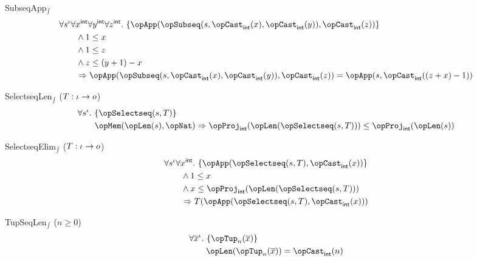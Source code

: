 \documentclass[11pt, a4paper, oneside]{article}
\begin{document}
\begin{axioms}
\item[SubseqApp$_\int$] \[
        \begin{aligned}
            &\forall s^\idv \forall x^\int \forall y^\int \forall z^\int.\, \st{ \opApp(\opSubseq(s, \opCast_\int(x), \opCast_\int(y)), \opCast_\int(z)) } \\
            &\qquad \wedge 1 \le x \\
            &\qquad \wedge 1 \le z \\
            &\qquad \wedge z \le (y + 1) - x \\
            &\qquad \imp \opApp(\opSubseq(s, \opCast_\int(x), \opCast_\int(y)), \opCast_\int(z)) = \opApp(s, \opCast_\int((z + x) - 1))
        \end{aligned}
    \]

\item[SelectseqLen$_\int$ ($T : \iota \rightarrow o$)] \[
        \begin{aligned}
            &\forall s^\idv.\, \st{ \opSelectseq(s, T) } \\
            &\qquad \opMem(\opLen(s), \opNat) \imp \opProj_\int(\opLen(\opSelectseq(s, T))) \le \opProj_\int(\opLen(s))
        \end{aligned}
    \]

\item[SelectseqElim$_\int$ ($T : \iota \rightarrow o$)] \[
        \begin{aligned}
            &\forall s^\idv \forall x^\int.\, \st{ \opApp(\opSelectseq(s, T), \opCast_\int(x)) } \\
            &\qquad \wedge 1 \le x \\
            &\qquad \wedge x \le \opProj_\int(\opLen(\opSelectseq(s, T))) \\
            &\qquad \imp T(\opApp(\opSelectseq(s, T), \opCast_\int(x)))
        \end{aligned}
    \]

\item[TupSeqLen$_\int$ ($n \ge 0$)] \[
        \begin{aligned}
            &\forall \overline{x}^\idv.\, \st{ \opTup_n(\overline{x}) } \\
            &\qquad \opLen(\opTup_n(\overline{x})) = \opCast_\int(n)
        \end{aligned}
    \]

\end{axioms}
\end{document}
